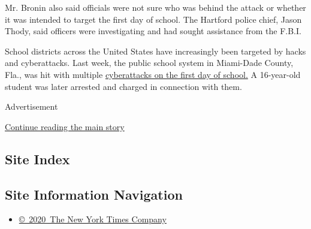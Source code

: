 Mr. Bronin also said officials were not sure who was behind the attack
or whether it was intended to target the first day of school. The
Hartford police chief, Jason Thody, said officers were investigating and
had sought assistance from the F.B.I.

School districts across the United States have increasingly been
targeted by hacks and cyberattacks. Last week, the public school system
in Miami-Dade County, Fla., was hit with multiple
\href{https://www.nytimes3xbfgragh.onion/2020/09/03/us/miami-dade-school-cyberattack.html?module=inline}{cyberattacks
on the first day of school.} A 16-year-old student was later arrested
and charged in connection with them.

Advertisement

\protect\hyperlink{after-bottom}{Continue reading the main story}

\hypertarget{site-index}{%
\subsection{Site Index}\label{site-index}}

\hypertarget{site-information-navigation}{%
\subsection{Site Information
Navigation}\label{site-information-navigation}}

\begin{itemize}
\tightlist
\item
  \href{https://help.nytimes3xbfgragh.onion/hc/en-us/articles/115014792127-Copyright-notice}{©~2020~The
  New York Times Company}
\end{itemize}

